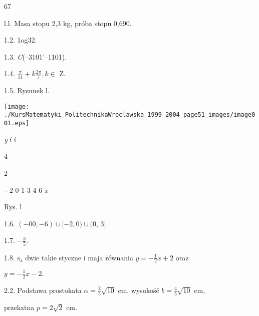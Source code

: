 \documentclass[a4paper,12pt]{article}
\begin{document}
67

l.l. Masa stopu 2,3 kg, próba stopu 0,690.

1.2. 1og32.

1.3. {\it C}(--3101'--1101).

1.4. $\displaystyle \frac{\pi}{14}+k\frac{2\pi}{7},  k\in$ Z.

1.5. Rysunek l.
\begin{center}
\texttt{[image: ./KursMatematyki\_PolitechnikaWroclawska\_1999\_2004\_page51\_images/image001.eps]}
\end{center}
{\it y}  í í

4

2

$-2$  0 1  3 4  6 {\it x}

Rys. l

1.6. $(- 00,-6)\cup[-2,0)\cup(0$, 3$].$

1.7. $-\displaystyle \frac{3}{5}.$

1.8. $\mathrm{s}_{\mathrm{a}}$ dwie takie styczne $\mathrm{i}$ maja równania $y = -\displaystyle \frac{1}{2}x +2$ oraz

$y=-\displaystyle \frac{1}{2}x-2.$

2.2. Podstawa prostokata $\alpha = \displaystyle \frac{2}{5}\sqrt{10}$ cm, wysokośč $b = \displaystyle \frac{4}{5}\sqrt{10}$ cm,

przekatna $p=2\sqrt{2}$ cm.
\end{document}
